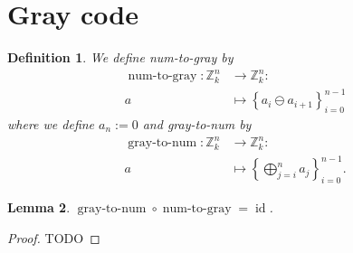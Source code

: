 \documentclass[10pt,a4paper,BCOR = 12mm,DIV=15]{scrbook}
\newtheorem{Def}{Definition}
\newtheorem{Le}[Def]{Lemma}
\newcommand{\id}{\operatorname{id}}
\newcommand{\numgray}{\operatorname{num-to-gray}}
\newcommand{\graynum}{\operatorname{gray-to-num}}
\begin{document}
\section{Gray code}

\begin{Def}
We define \emph{num-to-gray} by
\begin{align*}
\numgray: \mathbb{Z}_k^n & \rightarrow \mathbb{Z}_k^n: \\
a & \mapsto \left\{
a_i \ominus a_{i+1} 
\right\}_{i=0}^{n-1}
\end{align*}
where we define $a_n := 0$ and \emph{gray-to-num} by
\begin{align*}
\graynum: \mathbb{Z}_k^n & \rightarrow \mathbb{Z}_k^n: \\
a & \mapsto \left\{
\bigoplus_{j=i}^n a_j
\right\}_{i=0}^{n-1}.
\end{align*}
\end{Def}

\begin{Le}
$\graynum \circ \numgray = \id$.
\end{Le}
\begin{proof}
TODO
\end{proof}
\end{document}
